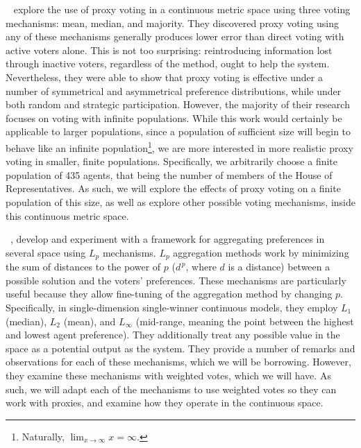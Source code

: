~\cite{Cohensius2017} explore the use of proxy voting in a
continuous metric space using three voting mechanisms: mean, median, and majority.
They discovered proxy voting using any of these mechanisms generally produces lower
error than direct voting with active voters alone.
This is not too surprising: reintroducing information lost through inactive voters,
regardless of the method, ought to help the system.
Nevertheless, they were able to show that proxy voting is effective under a number of
symmetrical and asymmetrical preference distributions, while under both random and
strategic participation.
However, the majority of their research focuses on voting with infinite populations.
While this work would certainly be applicable to larger populations, since a
population of sufficient size will begin to behave like an infinite
population\footnote{
    Naturally, $\lim_{x \rightarrow \infty} x = \infty$.
}, we are more interested in more realistic proxy voting in smaller, finite
populations.
Specifically, we arbitrarily choose a finite population of 435 agents, that being the
number of members of the House of Representatives.
As such, we will explore the effects of proxy voting on a finite population of this
size, as well as explore other possible voting mechanisms, inside this continuous
metric space.

~\cite{Bulteau2021}, develop and experiment with a framework for
aggregating preferences in several space using $L_p$ mechanisms.
$L_p$ aggregation methods work by minimizing the sum of distances to the power of $p$
($d^{\,p}$, where $d$ is a distance) between a possible solution and the voters'
preferences.
These mechanisms are particularly useful because they allow fine-tuning of the
aggregation method by changing $p$.
Specifically, in single-dimension single-winner continuous models, they employ $L_1$
(median),
$L_2$ (mean), and $L_{\infty}$ (mid-range, meaning the point between the highest and
lowest agent preference).
They additionally treat any possible value in the space as a potential output as the
system.
They provide a number of remarks and observations for each of these mechanisms, which
we will be borrowing.
However, they examine these mechanisms with weighted votes, which we will have.
As such, we will adapt each of the mechanisms to use weighted votes so they can work
with proxies, and examine how they operate in the continuous space.

